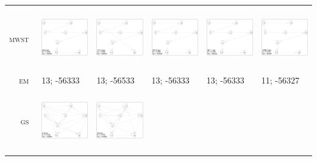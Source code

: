 \begin{table}[!p]
\begin{tabular}{r@{}p{2.9cm}@{}p{2.9cm}@{}p{2.9cm}@{}p{2.9cm}@{}p{2.90cm}}
\textsc{mwst~} &
\includegraphics[width=29.34mm, height=26.7mm]{fig/MWST-EM-500} &
\includegraphics[width=29.34mm, height=26.7mm]{fig/MWST-EM-1000} &
\includegraphics[width=29.34mm, height=26.7mm]{fig/MWST-EM-2000} &
\includegraphics[width=29.34mm, height=26.7mm]{fig/MWST-EM-5000} &
\includegraphics[width=29.34mm, height=26.7mm]{fig/MWST-EM-10000} \\
\textsc{em~}
& 13; -56333 & 13; -56533 & 13; -56333 & 13; -56333 & 11; -56327 \\
\textsc{gs~} &
\includegraphics[width=29.34mm, height=26.7mm]{fig/GS-ACA-500} &
\includegraphics[width=29.34mm, height=26.7mm]{fig/GS-ACA-1000} &

\end{tabular}
\end{table}
